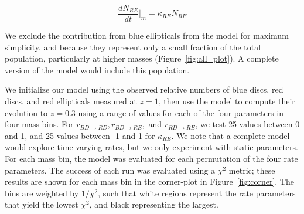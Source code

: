 \documentclass[useAMS,usenatbib]{mn2e}
\begin{document}
\begin{equation}
\frac{dN_{RE}}{dt}\Big\rvert_{m} = \kappa_{RE} N_{RE}  
\label{eqn:RE}
\end{equation}

We exclude the contribution from blue ellipticals from the model for maximum simplicity, and because they represent only a small fraction of the total population, particularly at higher masses (Figure~\ref{fig:all_plot}). A complete version of the model would include this population. 

We initialize our model using the observed relative numbers of blue discs, red discs, and red ellipticals measured at $z=1$, then use the model to compute their evolution to $z=0.3$ using a range of values for each of the four parameters in four mass bins. For $r_{BD \rightarrow RD}, r_{BD \rightarrow RE},$ and $r_{RD \rightarrow RE}$, we test 25 values between 0 and 1, and 25 values between -1 and 1 for $\kappa_{RE}$. We note that a complete model would explore time-varying rates, but we only experiment with static parameters. For each mass bin, the model was evaluated for each permutation of the four rate parameters. The success of each run was evaluated using a $\chi^2$ metric; these results are shown for each mass bin in the corner-plot in Figure~\ref{fig:corner}. The bins are weighted by $1/\chi^2$, such that white regions represent the rate parameters that yield the lowest $\chi^2$, and black representing the largest.
\end{document}
